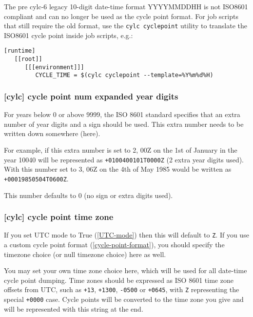 The pre cylc-6 legacy 10-digit date-time format YYYYMMDDHH is not ISO8601
compliant and can no longer be used as the cycle point format. For job
scripts that still require the old format, use the
\lstinline=cylc cyclepoint= utility to translate the ISO8601 cycle point
inside job scripts, e.g.:

\lstset{language=suiterc}
\begin{lstlisting}
[runtime]
   [[root]]
      [[[environment]]]
         CYCLE_TIME = $(cylc cyclepoint --template=%Y%m%d%H)
\end{lstlisting}

\subsubsection[cycle point num expanded year digits]{ [cylc] \textrightarrow
cycle point num expanded year digits}
\label{cycle-point-num-expanded-year-digits}

For years below 0 or above 9999, the ISO 8601 standard specifies that an
extra number of year digits and a sign should be used. This extra number needs
to be written down somewhere (here).

For example, if this extra number is set to 2, 00Z on the 1st of January in
the year 10040 will be represented as \lstinline=+0100400101T0000Z= (2 extra
year digits used). With this number set to 3, 06Z on the 4th of May 1985 would
be written as \lstinline=+00019850504T0600Z=.

This number defaults to 0 (no sign or extra digits used).

\subsubsection[cycle point time zone]{ [cylc] \textrightarrow
cycle point time zone}
\label{cycle-point-time-zone}

If you set UTC mode to True (\ref{UTC-mode}) then this will default to
\lstinline=Z=. If you use a custom cycle point format
(\ref{cycle-point-format}), you should specify the timezone choice (or null
timezone choice) here as well.

You may set your own time zone choice here, which will be used for all
date-time cycle point dumping. Time zones should be expressed as ISO 8601 time
zone offsets from UTC, such as \lstinline=+13=, \lstinline=+1300=,
\lstinline=-0500= or \lstinline=+0645=, with \lstinline=Z= representing the
special \lstinline=+0000= case. Cycle points will be converted to the time
zone you give and will be represented with this string at the end.

